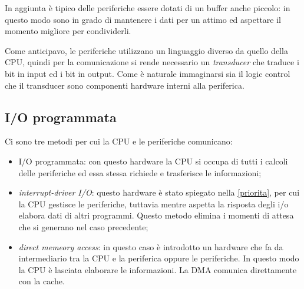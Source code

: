 \documentclass{article}
\begin{document}
In aggiunta è tipico delle periferiche essere dotati di un buffer anche piccolo: in questo modo sono in grado di mantenere i dati per un attimo ed aspettare il momento migliore per condividerli.

Come anticipavo, le periferiche utilizzano un linguaggio diverso da quello della CPU, quindi per la comunicazione si rende necessario un \textit{transducer} che traduce i bit in input ed i bit in output. Come è naturale immaginarsi sia il logic control che il transducer sono componenti hardware interni alla periferica.

\subsection{I/O programmata}

Ci sono tre metodi per cui la CPU e le periferiche comunicano:
\begin{itemize}
	\item I/O programmata: con questo hardware la CPU si occupa di tutti i calcoli delle periferiche ed essa stessa richiede e trasferisce le informazioni;

	\item \textit{interrupt-driver I/O}: questo hardware è stato spiegato nella \autoref{priorita}, per cui la CPU gestisce le periferiche, tuttavia mentre aspetta la risposta degli i/o elabora dati di altri programmi. Questo metodo elimina i momenti di attesa che si generano nel caso precedente;

	\item \textit{direct memeory access}: in questo caso è introdotto un hardware che fa da intermediario tra la CPU e la periferica oppure le periferiche. In questo modo la CPU è lasciata elaborare le informazioni. La DMA comunica direttamente con la cache.
\end{itemize}
\end{document}
